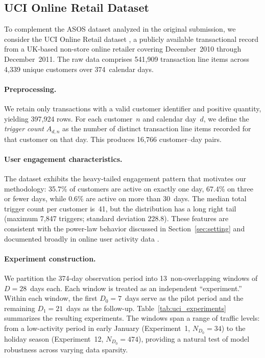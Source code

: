 
\subsection{UCI Online Retail Dataset}\label{sec:uci_data}

To complement the ASOS dataset analyzed in the original submission,
we consider the UCI Online Retail dataset \citep{chen2012data},
a publicly available transactional record from a UK-based non-store
online retailer covering December~2010 through December~2011.
The raw data comprises 541{,}909 transaction line items across
4{,}339 unique customers over 374~calendar days.

\paragraph{Preprocessing.}
We retain only transactions with a valid customer identifier and
positive quantity, yielding 397{,}924 rows.
For each customer~$n$ and calendar day~$d$, we define the
\emph{trigger count} $A_{d,n}$ as the number of distinct transaction
line items recorded for that customer on that day.
This produces 16{,}766 customer--day pairs.

\paragraph{User engagement characteristics.}
The dataset exhibits the heavy-tailed engagement pattern
that motivates our methodology:
35.7\% of customers are active on exactly one day,
67.4\% on three or fewer days,
while 0.6\% are active on more than 30~days.
The median total trigger count per customer is~41,
but the distribution has a long right tail
(maximum 7{,}847 triggers; standard deviation 228.8).
These features are consistent with the power-law behavior
discussed in Section~\ref{sec:setting}
and documented broadly in online user activity data
\citep{clauset2009power}.

\paragraph{Experiment construction.}
We partition the 374-day observation period into
13~non-overlapping windows of $D = 28$~days each.
Each window is treated as an independent ``experiment.''
Within each window, the first $D_0 = 7$~days serve as the
pilot period and the remaining $D_1 = 21$~days as the follow-up.
Table~\ref{tab:uci_experiments} summarizes the resulting experiments.
The windows span a range of traffic levels:
from a low-activity period in early January
(Experiment~1, $N_{D_0} = 34$)
to the holiday season
(Experiment~12, $N_{D_0} = 474$),
providing a natural test of model robustness across
varying data sparsity.

